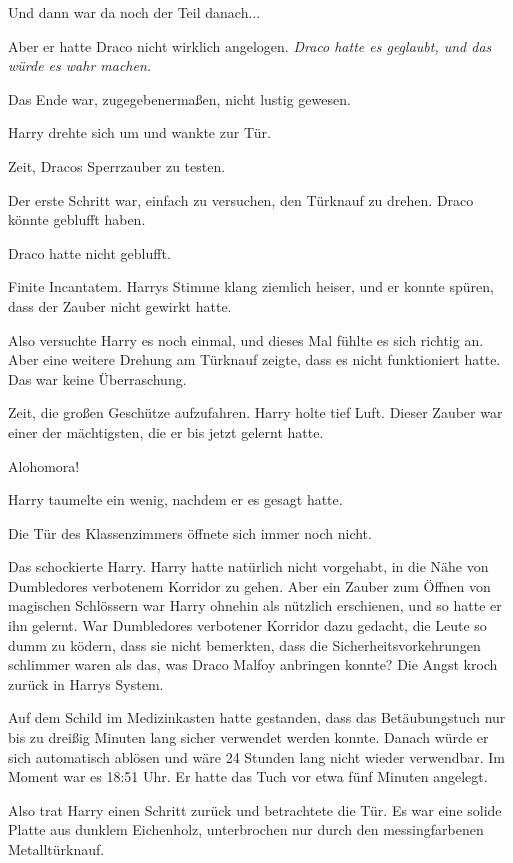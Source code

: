 Und dann war da noch der Teil danach...

Aber er hatte Draco nicht wirklich angelogen. \emph{Draco hatte es geglaubt, und
das würde es wahr machen.}

Das Ende war, zugegebenermaßen, nicht lustig gewesen.

Harry drehte sich um und wankte zur Tür.

Zeit, Dracos Sperrzauber zu testen.

Der erste Schritt war, einfach zu versuchen, den Türknauf zu drehen. Draco
könnte geblufft haben.

Draco hatte nicht geblufft.

\glqq Finite Incantatem.\grqq{} Harrys Stimme klang ziemlich heiser, und er
konnte spüren, dass der Zauber nicht gewirkt hatte.

Also versuchte Harry es noch einmal, und dieses Mal fühlte es sich richtig an.
Aber eine weitere Drehung am Türknauf zeigte, dass es nicht funktioniert hatte.
Das war keine Überraschung.

Zeit, die großen Geschütze aufzufahren. Harry holte tief Luft. Dieser Zauber war
einer der mächtigsten, die er bis jetzt gelernt hatte.

\glqq Alohomora!\grqq{}

Harry taumelte ein wenig, nachdem er es gesagt hatte.

Die Tür des Klassenzimmers öffnete sich immer noch nicht.

Das schockierte Harry. Harry hatte natürlich nicht vorgehabt, in die Nähe von
Dumbledores verbotenem Korridor zu gehen. Aber ein Zauber zum Öffnen von
magischen Schlössern war Harry ohnehin als nützlich erschienen, und so hatte er
ihn gelernt. War Dumbledores verbotener Korridor dazu gedacht, die Leute so dumm
zu ködern, dass sie nicht bemerkten, dass die Sicherheitsvorkehrungen schlimmer
waren als das, was Draco Malfoy anbringen konnte? Die Angst kroch zurück in
Harrys System.

Auf dem Schild im Medizinkasten hatte gestanden, dass das Betäubungstuch nur bis
zu dreißig Minuten lang sicher verwendet werden konnte. Danach würde er sich
automatisch ablösen und wäre 24 Stunden lang nicht wieder verwendbar. Im Moment
war es 18:51 Uhr. Er hatte das Tuch vor etwa fünf Minuten angelegt.

Also trat Harry einen Schritt zurück und betrachtete die Tür. Es war eine solide
Platte aus dunklem Eichenholz, unterbrochen nur durch den messingfarbenen
Metalltürknauf.

